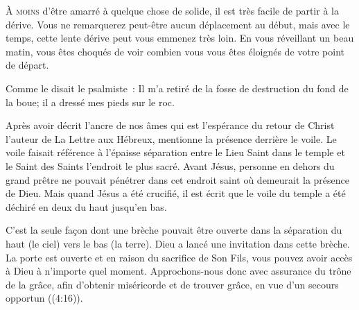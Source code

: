 \lettrine{À}{ moins} d'être amarré à quelque chose de solide,
 il est très facile de partir à la dérive.
 Vous ne remarquerez peut-être aucun déplacement au début,
 mais avec le temps, cette lente dérive peut vous emmenez très loin.
 En vous réveillant un beau matin, vous êtes choqués de voir
 combien vous vous êtes éloignés de votre point de départ. 

Comme le disait le psalmiste~: 
 \og Il m'a retiré de la fosse de destruction du fond de la boue;
 il a dressé mes pieds sur le roc. \fg{}


Après avoir décrit l'ancre de nos âmes
 \ocadr qui est l'espérance du retour de Christ \fcadr{}
 l'auteur de La Lettre aux Hébreux, mentionne la présence derrière le voile.
 Le voile faisait référence à l'épaisse séparation entre le Lieu Saint
 dans le temple et le Saint des Saints \ocadr l'endroit le plus sacré.
 Avant Jésus, personne en dehors du grand prêtre 
 ne pouvait pénétrer
 dans cet endroit saint où demeurait la présence de Dieu.
 Mais quand Jésus a été crucifié, il est écrit que le voile du temple
 a été déchiré en deux du haut jusqu'en bas.

C'est la seule façon dont une brèche pouvait être ouverte
 dans la séparation \ocadr du haut (le ciel) vers le bas (la terre).
 Dieu a lancé une invitation dans cette brèche. La porte est ouverte
 et en raison du sacrifice de Son Fils, vous pouvez avoir accès à Dieu
 à n'importe quel moment.
 \og Approchons-nous donc avec assurance du trône de la grâce,
 afin d'obtenir miséricorde et de trouver grâce,
 en vue d'un secours opportun \fg{} ((4:16)). 

\dvrule







